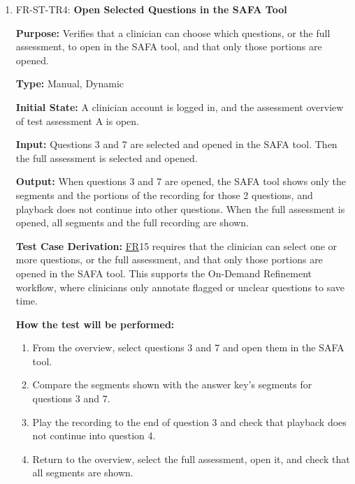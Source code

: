 \documentclass[12pt, titlepage]{article}
\newcommand{\srsfr}[1]{\href{https://github.com/Nour-Fawaz/MacaBoca/blob/main/pdfs/SRS/SRS.pdf}{FR}}
\renewcommand{\_}{\oldunderscore\allowbreak}
\begin{document}
\begin{enumerate}
  \item FR-ST-TR4: \textbf{Open Selected Questions in the SAFA Tool\\}
  \begin{mdframed}[linewidth=0.5mm]
      \textbf{Purpose:} Verifies that a clinician can choose which questions, or the full assessment, to open in the SAFA tool, and that only those portions are opened. \par
      \textbf{Type:} Manual, Dynamic \par
      \textbf{Initial State:} A clinician account is logged in, and the assessment overview of test assessment A is open. \par
      \textbf{Input:} Questions 3 and 7 are selected and opened in the SAFA tool. Then the full assessment is selected and opened. \par
      \textbf{Output:} When questions 3 and 7 are opened, the SAFA tool shows only the segments and the portions of the recording for those 2 questions, and playback does not continue into other questions. When the full assessment is opened, all segments and the full recording are shown. \par
      \textbf{Test Case Derivation:} \srsfr*{15} requires that the clinician can select one or more questions, or the full assessment, and that only those portions are opened in the SAFA tool. This supports the On-Demand Refinement workflow, where clinicians only annotate flagged or unclear questions to save time. \par
      \textbf{How the test will be performed:}
      \begin{enumerate}
        \item[1.] From the overview, select questions 3 and 7 and open them in the SAFA tool.
        \item[2.] Compare the segments shown with the answer key's segments for questions 3 and 7.
        \item[3.] Play the recording to the end of question 3 and check that playback does not continue into question 4.
        \item[4.] Return to the overview, select the full assessment, open it, and check that all segments are shown.
      \end{enumerate}
  \end{mdframed}
\end{enumerate}
\end{document}
